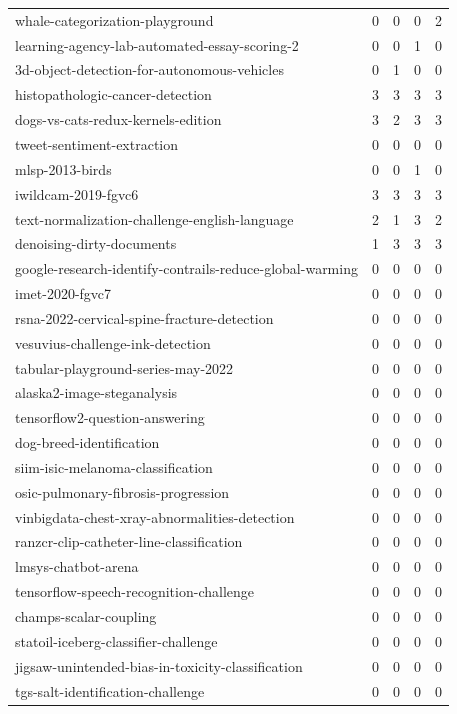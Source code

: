 {\begin{longtable}{p{6.2cm} c c c c}
whale-categorization-playground & 0 & 0 & 0 & 2 \\
learning-agency-lab-automated-essay-scoring-2 & 0 & 0 & 1 & 0 \\
3d-object-detection-for-autonomous-vehicles & 0 & 1 & 0 & 0 \\
histopathologic-cancer-detection & 3 & 3 & 3 & 3 \\
dogs-vs-cats-redux-kernels-edition & 3 & 2 & 3 & 3 \\
tweet-sentiment-extraction & 0 & 0 & 0 & 0 \\
mlsp-2013-birds & 0 & 0 & 1 & 0 \\
iwildcam-2019-fgvc6 & 3 & 3 & 3 & 3 \\
text-normalization-challenge-english-language & 2 & 1 & 3 & 2 \\
denoising-dirty-documents & 1 & 3 & 3 & 3 \\
google-research-identify-contrails-reduce-global-warming & 0 & 0 & 0 & 0 \\
imet-2020-fgvc7 & 0 & 0 & 0 & 0 \\
rsna-2022-cervical-spine-fracture-detection & 0 & 0 & 0 & 0 \\
vesuvius-challenge-ink-detection & 0 & 0 & 0 & 0 \\
tabular-playground-series-may-2022 & 0 & 0 & 0 & 0 \\
alaska2-image-steganalysis & 0 & 0 & 0 & 0 \\
tensorflow2-question-answering & 0 & 0 & 0 & 0 \\
dog-breed-identification & 0 & 0 & 0 & 0 \\
siim-isic-melanoma-classification & 0 & 0 & 0 & 0 \\
osic-pulmonary-fibrosis-progression & 0 & 0 & 0 & 0 \\
vinbigdata-chest-xray-abnormalities-detection & 0 & 0 & 0 & 0 \\
ranzcr-clip-catheter-line-classification & 0 & 0 & 0 & 0 \\
lmsys-chatbot-arena & 0 & 0 & 0 & 0 \\
tensorflow-speech-recognition-challenge & 0 & 0 & 0 & 0 \\
champs-scalar-coupling & 0 & 0 & 0 & 0 \\
statoil-iceberg-classifier-challenge & 0 & 0 & 0 & 0 \\
jigsaw-unintended-bias-in-toxicity-classification & 0 & 0 & 0 & 0 \\
tgs-salt-identification-challenge & 0 & 0 & 0 & 0 \\

\end{longtable}}
